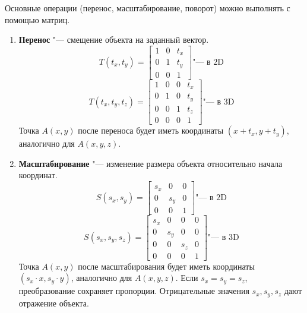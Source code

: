 Основные операции (перенос, масштабирование, поворот) можно выполнять с помощью матриц.
\begin{enumerate}
    \item \textbf{Перенос} "--- смещение объекта на заданный вектор.
    \begin{equation*}
        T(t_{x}, t_{y}) = 
        \begin{bmatrix}
            1 & 0 & t_{x} \\
            0 & 1 & t_{y} \\
            0 & 0 & 1
        \end{bmatrix}
        \text{"--- в 2D}
    \end{equation*}
    \begin{equation*}
        T(t_{x}, t_{y}, t_{z}) = 
        \begin{bmatrix}
            1 & 0 & 0 & t_{x} \\
            0 & 1 & 0 & t_{y} \\
            0 & 0 & 1 & t_{z} \\
            0 & 0 & 0 & 1
        \end{bmatrix}
        \text{"--- в 3D}
    \end{equation*}
    Точка $A(x, y)$ после переноса будет иметь координаты $(x + t_{x}, y + t_{y})$, аналогично для $A(x, y, z)$. \\
    \item \textbf{Масштабирование} "--- изменение размера объекта относительно начала координат.
    \begin{equation*}
        S(s_{x}, s_{y}) = 
        \begin{bmatrix}
            s_{x} & 0 & 0 \\
            0 & s_{y} & 0 \\
            0 & 0 & 1
        \end{bmatrix}
        \text{"--- в 2D}
    \end{equation*}
    \begin{equation*}
        S(s_{x}, s_{y}, s_{z}) = 
        \begin{bmatrix}
            s_{x} & 0 & 0 & 0 \\
            0 & s_{y} & 0 & 0 \\
            0 & 0 & s_{z} & 0 \\
            0 & 0 & 0 & 1
        \end{bmatrix}
        \text{"--- в 3D}
    \end{equation*}
    Точка $A(x, y)$ после масштабирования будет иметь координаты $(s_{x} \cdot x, s_{y} \cdot y)$, аналогично для $A(x, y, z)$. Если $s_{x} = s_{y} = s_{z}$, преобразование сохраняет пропорции. Отрицательные значения $s_{x}, s_{y}, s_{z}$ дают отражение объекта.

\end{enumerate}
